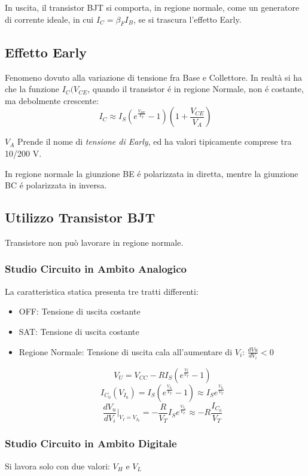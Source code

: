 \documentclass{article}
\begin{document}
In uscita, il transistor BJT si comporta, in regione normale, come un generatore di corrente ideale, in cui $I_C = \beta_F I_B$, se si trascura l'effetto Early.

\subsection{Effetto Early}
Fenomeno dovuto alla variazione di tensione fra Base e Collettore.
In realtà si ha che la funzione $I_C(V_{CE}$, quando il transistor \'e in regione Normale, non \'e costante, ma debolmente crescente:
\[ I_C \approx I_S\left(e^{\frac{V_{BE}}{V_T}} -1 \right)\left(1 + \frac{V_{CE}}{V_A}\right) \]

$V_A$ Prende il nome di \textit{tensione di Early}, ed ha valori tipicamente comprese tra 10/200 V.

In regione normale la giunzione BE \'e polarizzata in diretta, mentre la giunzione BC \'e polarizzata in inversa.

\subsection{Utilizzo Transistor BJT}
Transistore non può lavorare in regione normale.



\subsubsection{Studio Circuito in Ambito Analogico}
La caratteristica statica presenta tre tratti differenti:

\begin{itemize}
    \item OFF: Tensione di uscita costante
    \item SAT: Tensione di uscita costante
    \item Regione Normale:
        Tensione di uscita cala all'aumentare di $V_i$: $\frac{d Vu}{dV_i} < 0$

        \[ V_U = V_{CC} - R I_S \left( e^{\frac{V_I}{V_T}} -1\right) \]
        \[ I_{C_0}(V_{I_0}) = I_S \left( e^{\frac{V_{I_0}}{V_T}} -1 \right)  \approx I_S e^{\frac{V_{I_0}}{V_T}} \]
        \[ \frac{dV_u}{dV_i} \Big|_{V_I = V_{I_0}}=  -\frac{R}{V_T} I_S e^{\frac{V_{I_0}}{V_T}} \approx -R\frac{I_{C_0}}{V_T}\]

\end{itemize}

\subsubsection{Studio Circuito in Ambito Digitale}
Si lavora solo con due valori: $V_H$ e $V_L$
\end{document}
